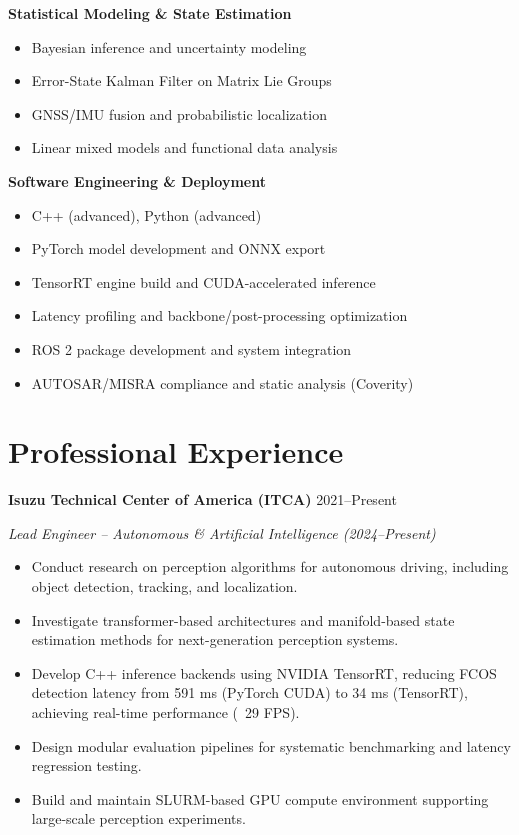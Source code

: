 \documentclass[11pt]{article}
\begin{document}
\textbf{Statistical Modeling \& State Estimation}
\begin{itemize}[leftmargin=*]
\item Bayesian inference and uncertainty modeling
\item Error-State Kalman Filter on Matrix Lie Groups
\item GNSS/IMU fusion and probabilistic localization
\item Linear mixed models and functional data analysis
\end{itemize}

\textbf{Software Engineering \& Deployment}
\begin{itemize}[leftmargin=*]
\item C++ (advanced), Python (advanced)
\item PyTorch model development and ONNX export
\item TensorRT engine build and CUDA-accelerated inference
\item Latency profiling and backbone/post-processing optimization
\item ROS 2 package development and system integration
\item AUTOSAR/MISRA compliance and static analysis (Coverity)
\end{itemize}

\section*{Professional Experience}

\textbf{Isuzu Technical Center of America (ITCA)} \hfill 2021--Present

\textit{Lead Engineer – Autonomous \& Artificial Intelligence (2024--Present)}
\begin{itemize}[leftmargin=*]
\item Conduct research on perception algorithms for autonomous driving, including object detection, tracking, and localization.
\item Investigate transformer-based architectures and manifold-based state estimation methods for next-generation perception systems.
\item Develop C++ inference backends using NVIDIA TensorRT, reducing FCOS detection latency from 591 ms (PyTorch CUDA) to 34 ms (TensorRT), achieving real-time performance (~29 FPS).
\item Design modular evaluation pipelines for systematic benchmarking and latency regression testing.
\item Build and maintain SLURM-based GPU compute environment supporting large-scale perception experiments.
\end{itemize}
\end{document}
